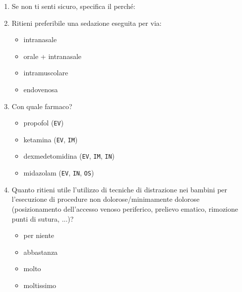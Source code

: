 \begin{tcolorbox}[breakable,notitle,boxrule=0pt,colback=xkcdCloudyBlue!30,colframe=xkcdCloudyBlue!30]
\begin{enumerate}
           \item Se non ti senti sicuro, specifica il perché:
           \item Ritieni preferibile una sedazione eseguita per via:
           \begin{itemize}
               \item intranasale
               \item orale + intranasale
               \item intramuscolare
               \item endovenosa
           \end{itemize}
           
           \item Con quale farmaco?
            \begin{itemize}
               \item propofol (\texttt{EV})
               \item ketamina (\texttt{EV}, \texttt{IM})
               \item dexmedetomidina (\texttt{EV}, \texttt{IM}, \texttt{IN})
               \item midazolam (\texttt{EV}, \texttt{IN}, \texttt{OS})
           \end{itemize}
           
           \item Quanto ritieni utile l’utilizzo di tecniche di distrazione nei bambini per l’esecuzione di procedure non dolorose/minimamente dolorose (posizionamento dell'accesso venoso periferico, prelievo ematico, rimozione punti di sutura, ...)?
           \begin{itemize}
               \item per niente
               \item abbastanza
               \item molto
               \item moltissimo
           \end{itemize}
           

\end{enumerate}
\end{tcolorbox}
